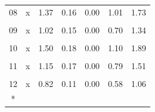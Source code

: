 \begin{longtable}[t]{ccrrrrr}
08 & x & 1.37 & 0.16 & 0.00 & 1.01 & 1.73\\
\cellcolor{gray!10}{09} & \cellcolor{gray!10}{(Intercept)} & \cellcolor{gray!10}{135649.96} & \cellcolor{gray!10}{21410.49} & \cellcolor{gray!10}{0.00} & \cellcolor{gray!10}{89000.52} & \cellcolor{gray!10}{182299.41}\\
09 & x & 1.02 & 0.15 & 0.00 & 0.70 & 1.34\\
\cellcolor{gray!10}{10} & \cellcolor{gray!10}{(Intercept)} & \cellcolor{gray!10}{71917.14} & \cellcolor{gray!10}{14721.70} & \cellcolor{gray!10}{0.00} & \cellcolor{gray!10}{39841.32} & \cellcolor{gray!10}{103992.96}\\
10 & x & 1.50 & 0.18 & 0.00 & 1.10 & 1.89\\
\cellcolor{gray!10}{11} & \cellcolor{gray!10}{(Intercept)} & \cellcolor{gray!10}{51593.02} & \cellcolor{gray!10}{6355.96} & \cellcolor{gray!10}{0.00} & \cellcolor{gray!10}{37744.58} & \cellcolor{gray!10}{65441.46}\\
11 & x & 1.15 & 0.17 & 0.00 & 0.79 & 1.51\\
\cellcolor{gray!10}{12} & \cellcolor{gray!10}{(Intercept)} & \cellcolor{gray!10}{34101.47} & \cellcolor{gray!10}{2607.18} & \cellcolor{gray!10}{0.00} & \cellcolor{gray!10}{28420.91} & \cellcolor{gray!10}{39782.04}\\
12 & x & 0.82 & 0.11 & 0.00 & 0.58 & 1.06\\*
\end{longtable}
